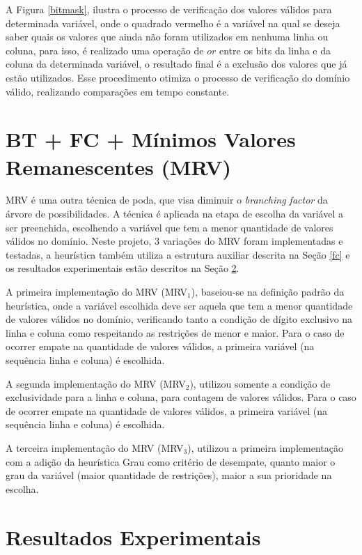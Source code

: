 \documentclass[9pt,technote,compsoc]{IEEEtran}
\begin{document}
A Figura \ref{bitmask}, ilustra o processo de verificação dos valores válidos para determinada variável, onde o quadrado vermelho é a variável na qual se deseja saber quais os valores que ainda não foram utilizados em nenhuma linha ou coluna, para isso, é realizado uma operação de $or$ entre os bits da linha e da coluna da determinada variável, o resultado final é a exclusão dos valores que já estão utilizados. Esse procedimento otimiza o processo de verificação do domínio válido, realizando comparações em tempo constante. 


\section{BT + FC + Mínimos Valores Remanescentes (MRV)}\label{mrv}

MRV é uma outra técnica de poda, que visa diminuir o \textit{branching factor} da árvore de possibilidades. A técnica é aplicada na etapa de escolha da variável a ser preenchida, escolhendo a variável que tem a menor quantidade de valores válidos no domínio. Neste projeto, 3 variações do MRV foram implementadas e testadas, a heurística também utiliza a estrutura auxiliar descrita na Seção \ref{fc} e os resultados experimentais estão descritos na Seção \ref{experiments}.

A primeira implementação do MRV (MRV$_{1}$), baseiou-se na definição padrão da heurística, onde a variável escolhida deve ser aquela que tem a menor quantidade de valores válidos no domínio, verificando tanto a condição de dígito exclusivo na linha e coluna como respeitando as restrições de menor e maior. Para o caso de ocorrer empate na quantidade de valores válidos, a primeira variável (na sequência linha e coluna) é escolhida.

A segunda implementação do MRV (MRV$_{2}$), utilizou somente a condição de exclusividade para a linha e coluna, para contagem de valores válidos. Para o caso de ocorrer empate na quantidade de valores válidos, a primeira variável (na sequência linha e coluna) é escolhida.

A terceira implementação do MRV (MRV$_{3}$), utilizou a primeira implementação com a adição da heurística Grau como critério de desempate, quanto maior o grau da variável (maior quantidade de restrições), maior a sua prioridade na escolha.

\section{Resultados Experimentais}\label{experiments}
\end{document}
